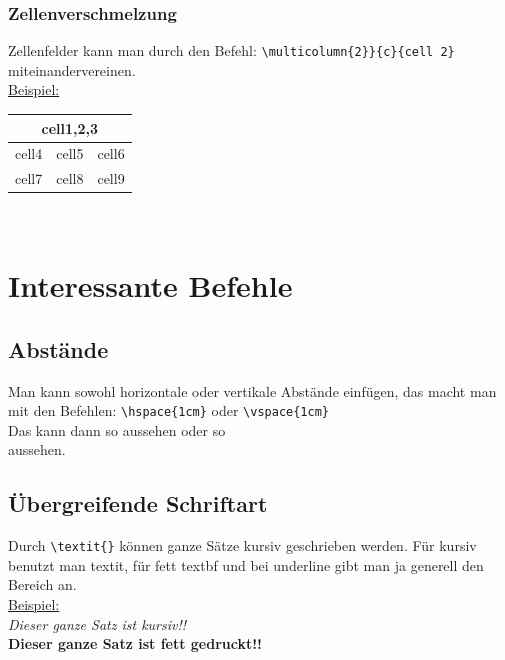 \documentclass{report}
\begin{document}
\subsubsection*{Zellenverschmelzung}
Zellenfelder kann man durch den Befehl: {\color{blue}\verb|\multicolumn{2}}{c}{cell 2}|} miteinandervereinen.\\
\underline{Beispiel:}\\
\vspace{0.5cm}
\begin{tabular}{c|c|c}
\hline
\multicolumn{3}{c}{cell1,2,3}\\
\hline
cell4 & cell5 & cell6\\
cell7 & cell8 & cell9\\
\end{tabular}\\
\vspace{0.5cm}

\section*{Interessante Befehle}
\subsection*{Abstände}
Man kann sowohl horizontale oder vertikale Abstände einfügen, das macht man mit den Befehlen: {\color{blue}\verb|\hspace{1cm}|} oder {\color{blue}\verb|\vspace{1cm}|}\\
Das kann dann so \hspace{3cm} aussehen oder so \vspace{1cm}\\ aussehen.

\subsection*{Übergreifende Schriftart}
Durch {\color{blue}\verb|\textit{}|} können ganze Sätze kursiv geschrieben werden. Für kursiv benutzt man {\color{blue}textit}, für fett {\color{blue}textbf} und bei underline gibt man ja generell den Bereich an.\\
\underline{Beispiel:}\\
\textit{Dieser ganze Satz ist kursiv!!}\\
\textbf{Dieser ganze Satz ist fett gedruckt!!}
\end{document}
